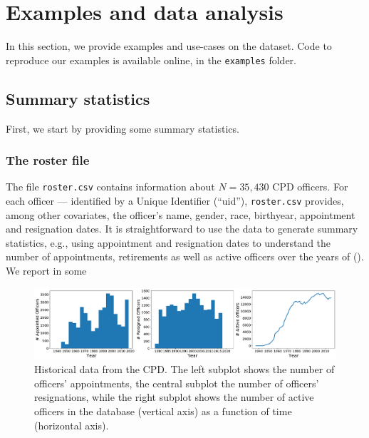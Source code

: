 
\section{Examples and data analysis} \label{sec:analysis}

In this section, we provide examples and use-cases on the dataset. Code to reproduce our examples is available online, in the \texttt{examples} folder.

\subsection{Summary statistics}

First, we start by providing some summary statistics. 

\subsubsection{The roster file}
The file \texttt{roster.csv} contains information about $N=35{,}430$ CPD officers. For each officer --- identified by a Unique Identifier (``uid''), \texttt{roster.csv} provides, among other covariates, the officer's name, gender, race, birthyear, appointment and resignation dates. It is straightforward  to use the data to generate summary statistics, e.g., using appointment and resignation dates to understand the number of appointments, retirements as well as active officers over the years of  (). We report in  some 
\begin{figure}[h] 
	\includegraphics[width=\textwidth]{figs/history} 
	\caption{Historical data from the CPD. The left subplot shows the number of officers' appointments, the central subplot the number of officers' resignations, while the right subplot shows the number of active officers in the database (vertical axis) as a function of time (horizontal axis).} \label{fig:history}
\end{figure}


